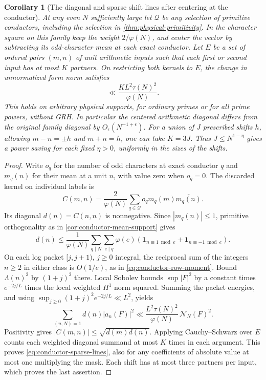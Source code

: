 \documentclass[11pt,a4paper]{article}
\numberwithin{equation}{section}
\newtheorem{corollary}[theorem]{Corollary}
\newcommand{\NN}{\mathcal N_N}
\begin{document}
\begin{corollary}[The diagonal and sparse shift lines after centering at the conductor]
\label{cor:conductor-sparse-lines}
At any even $N$ sufficiently large let $\mathcal Q$ be any
selection of primitive conductors, including the selection in
\cref{thm:physical-primitivity}. In the character square on this
family keep the weight $2/\varphi(N)$, and center the vector by
subtracting its odd-character mean at each exact conductor.
Let $E$ be a set of ordered pairs $(m,n)$ of unit arithmetic
inputs such that each first or second input has at most $K$
partners. On restricting both kernels to $E$, the change in
unnormalized form norm satisfies
\begin{equation}
 \ll \frac{K L^2\tau(N)^2}{\varphi(N)} .
 \label{eq:conductor-sparse-lines}
\end{equation}
This holds on arbitrary physical supports, for ordinary primes
or for all prime powers, without GRH. In particular the centered
arithmetic diagonal differs from the original family diagonal
by $O_\epsilon(N^{-1+\epsilon})$. For a union of $J$ prescribed
shifts $h$, allowing $m-n=\pm h$ and $m+n=h$, one can take
$K=3J$. Thus $J\le N^{1-\eta}$ gives a power saving for each
fixed $\eta>0$, uniformly in the sizes of the shifts.
\end{corollary}

\begin{proof}
Write $o_q$ for the number of odd characters at exact conductor
$q$ and $m_q(n)$ for their mean at a unit $n$, with value zero
when $o_q=0$. The discarded kernel on individual labels is
\[
 C(m,n)=\frac{2}{\varphi(N)}
     \sum_{q\in\mathcal Q}o_q m_q(m)\overline{m_q(n)}.
\]
Its diagonal $d(n)=C(n,n)$ is nonnegative. Since $|m_q(n)|\le1$,
primitive orthogonality as in \cref{cor:conductor-mean-support}
gives
\[
 d(n)\le\frac1{\varphi(N)}
   \sum_{q\mid N}\sum_{e\mid q}\varphi(e)
          (\mathbf1_{n\equiv1\bmod e}+\mathbf1_{n\equiv-1\bmod e}).
\]
On each log packet $[j,j+1)$, $j\ge0$ integral, the reciprocal
sum of the integers $n\ge2$ in either class is $O(1/e)$, as in
\eqref{eq:conductor-row-moment}. Bound $\Lambda(n)^2$ by
$(1+j)^2$ there. Local Sobolev bounds $\sup |F|^2$ by a constant
times $e^{-2j/L}$ times the local weighted $H^1$ norm squared.
Summing the packet energies, and using
$\sup_{j\ge0}(1+j)^2 e^{-2j/L}\ll L^2$, yields
\[
 \sum_{(n,N)=1} d(n)|a_n(F)|^2
    \ll \frac{L^2\tau(N)^2}{\varphi(N)}\,\NN(F)^2 .
\]
Positivity gives $|C(m,n)|\le\sqrt{d(m)d(n)}$. Applying
Cauchy--Schwarz over $E$ counts each weighted diagonal summand
at most $K$ times in each argument. This proves
\eqref{eq:conductor-sparse-lines}, also for any coefficients of
absolute value at most one multiplying the mask. Each shift has
at most three partners per input, which proves the last assertion.
\end{proof}
\end{document}
